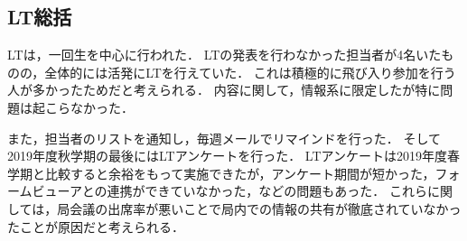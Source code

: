 \subsection*{LT総括}

LTは，一回生を中心に行われた．
LTの発表を行わなかった担当者が4名いたものの，全体的には活発にLTを行えていた．
これは積極的に飛び入り参加を行う人が多かったためだと考えられる．
内容に関して，情報系に限定したが特に問題は起こらなかった．

また，担当者のリストを通知し，毎週メールでリマインドを行った．
そして2019年度秋学期の最後にはLTアンケートを行った．
LTアンケートは2019年度春学期と比較すると余裕をもって実施できたが，アンケート期間が短かった，フォームビューアとの連携ができていなかった，などの問題もあった．
これらに関しては，局会議の出席率が悪いことで局内での情報の共有が徹底されていなかったことが原因だと考えられる．
